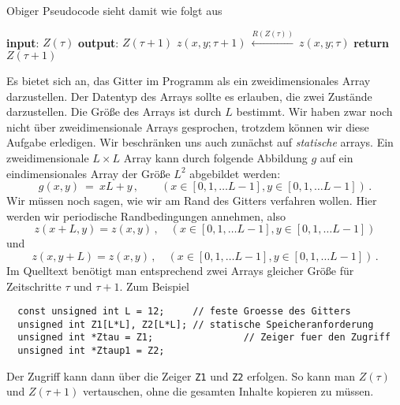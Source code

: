\documentclass{article}[12pt]
\begin{document}
Obiger Pseudocode sieht damit wie folgt aus
\begin{algorithmic}[1]
  \State \textbf{input}: $Z(\tau)$
  \State \textbf{output}: $Z(\tau+1)$
  \State $z(x,y; \tau+1)\ \stackrel{R(Z(\tau))}{\longleftarrow}\ z(x,y; \tau)$
  \EndFor
  \EndFor
  \State \textbf{return} $Z(\tau+1)$
  \EndProcedure
\end{algorithmic}
Es bietet sich an, das Gitter im Programm als ein zweidimensionales Array darzustellen.
Der Datentyp des Arrays sollte es erlauben, die zwei Zustände darzustellen.
Die Größe des Arrays ist durch $L$ bestimmt.
Wir haben zwar noch nicht über zweidimensionale Arrays gesprochen, trotzdem können wir diese Aufgabe erledigen. 
Wir beschränken uns auch zunächst auf \emph{statische} arrays.
Ein zweidimensionale $L\times L$ Array kann durch folgende Abbildung $g$ auf ein eindimensionales Array der Größe $L^2$ abgebildet werden:
\begin{equation}
  g(x,y)\ =\ xL + y\,,\qquad (x\in[0,1,\ldots L-1], y\in[0,1,\ldots L-1])\,.
\end{equation}
Wir müssen noch sagen, wie wir am Rand des Gitters verfahren wollen.
Hier werden wir periodische Randbedingungen annehmen, also
\begin{equation}
  z(x+L,y)= z(x,y)\,,\quad (x\in[0,1,\ldots L-1], y\in[0,1,\ldots L-1])
\end{equation}
und
\begin{equation}
  z(x,y+L)= z(x, y)\,,\quad (x\in[0,1,\ldots L-1], y\in[0,1,\ldots L-1])\,.
\end{equation}
Im Quelltext benötigt man entsprechend zwei Arrays gleicher Größe für Zeitschritte $\tau$ und $\tau+1$.
Zum Beispiel
\begin{lstlisting}
  const unsigned int L = 12;     // feste Groesse des Gitters
  unsigned int Z1[L*L], Z2[L*L]; // statische Speicheranforderung
  unsigned int *Ztau = Z1;                // Zeiger fuer den Zugriff
  unsigned int *Ztaup1 = Z2;
\end{lstlisting}
Der Zugriff kann dann über die Zeiger \texttt{Z1} und \texttt{Z2} erfolgen.
So kann man $Z(\tau)$ und $Z(\tau+1)$ vertauschen, ohne die gesamten Inhalte kopieren zu müssen.
\end{document}
